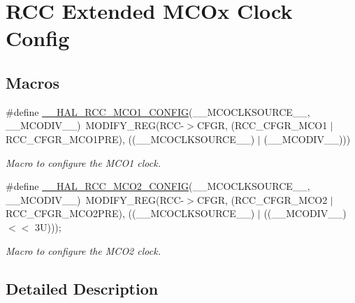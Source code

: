 \hypertarget{group___r_c_c_ex___m_c_ox___clock___config}{}\section{R\+CC Extended M\+C\+Ox Clock Config}
\label{group___r_c_c_ex___m_c_ox___clock___config}
\subsection*{Macros}
\begin{DoxyCompactItemize}
\item 
\#define \mbox{\hyperlink{group___r_c_c_ex___m_c_ox___clock___config_ga7e5f7f1efc92794b6f0e96068240b45e}{\+\_\+\+\_\+\+H\+A\+L\+\_\+\+R\+C\+C\+\_\+\+M\+C\+O1\+\_\+\+C\+O\+N\+F\+IG}}(\+\_\+\+\_\+\+M\+C\+O\+C\+L\+K\+S\+O\+U\+R\+C\+E\+\_\+\+\_\+,  \+\_\+\+\_\+\+M\+C\+O\+D\+I\+V\+\_\+\+\_\+)~M\+O\+D\+I\+F\+Y\+\_\+\+R\+EG(R\+CC-\/$>$C\+F\+GR, (R\+C\+C\+\_\+\+C\+F\+G\+R\+\_\+\+M\+C\+O1 $\vert$ R\+C\+C\+\_\+\+C\+F\+G\+R\+\_\+\+M\+C\+O1\+P\+RE), ((\+\_\+\+\_\+\+M\+C\+O\+C\+L\+K\+S\+O\+U\+R\+C\+E\+\_\+\+\_\+) $\vert$ (\+\_\+\+\_\+\+M\+C\+O\+D\+I\+V\+\_\+\+\_\+)))
\begin{DoxyCompactList}\small\item\em Macro to configure the M\+C\+O1 clock. \end{DoxyCompactList}\item 
\#define \mbox{\hyperlink{group___r_c_c_ex___m_c_ox___clock___config_gabb7360422910dd65312786fc49722d25}{\+\_\+\+\_\+\+H\+A\+L\+\_\+\+R\+C\+C\+\_\+\+M\+C\+O2\+\_\+\+C\+O\+N\+F\+IG}}(\+\_\+\+\_\+\+M\+C\+O\+C\+L\+K\+S\+O\+U\+R\+C\+E\+\_\+\+\_\+,  \+\_\+\+\_\+\+M\+C\+O\+D\+I\+V\+\_\+\+\_\+)~M\+O\+D\+I\+F\+Y\+\_\+\+R\+EG(R\+CC-\/$>$C\+F\+GR, (R\+C\+C\+\_\+\+C\+F\+G\+R\+\_\+\+M\+C\+O2 $\vert$ R\+C\+C\+\_\+\+C\+F\+G\+R\+\_\+\+M\+C\+O2\+P\+RE), ((\+\_\+\+\_\+\+M\+C\+O\+C\+L\+K\+S\+O\+U\+R\+C\+E\+\_\+\+\_\+) $\vert$ ((\+\_\+\+\_\+\+M\+C\+O\+D\+I\+V\+\_\+\+\_\+) $<$$<$ 3\+U)));
\begin{DoxyCompactList}\small\item\em Macro to configure the M\+C\+O2 clock. \end{DoxyCompactList}\end{DoxyCompactItemize}


\subsection{Detailed Description}


